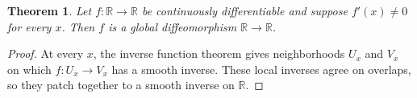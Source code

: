 \documentclass{article}
\newtheorem{theorem}{Theorem}
\begin{document}
\begin{theorem}\label{thm:local-global}
Let $f:\mathbb R\to\mathbb R$ be continuously differentiable and suppose
$f'(x)\ne0$ for every $x$. Then $f$ is a global diffeomorphism
$\mathbb R\to\mathbb R$.
\end{theorem}
\begin{proof}
At every $x$, the inverse function theorem gives neighborhoods $U_x$ and
$V_x$ on which $f:U_x\to V_x$ has a smooth inverse. These local inverses
agree on overlaps, so they patch together to a smooth inverse on
$\mathbb R$.
\end{proof}
\end{document}
